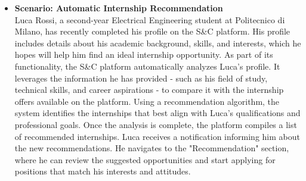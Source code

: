 \begin{itemize}
        \incscenario
    \item \textbf{\nth{\thescenario} Scenario: Automatic Internship Recommendation}
    \\
        Luca Rossi, a second-year Electrical Engineering student at Politecnico di Milano, has recently completed his profile on the S\&C platform. His profile includes details about his academic background, skills, and interests, which he hopes will help him find an ideal internship opportunity.
        As part of its functionality, the S\&C platform automatically analyzes Luca’s profile. It leverages the information he has provided - such as his field of study, technical skills, and career aspirations - to compare it with the internship offers available on the platform. Using a recommendation algorithm, the system identifies the internships that best align with Luca’s qualifications and professional goals.
        Once the analysis is complete, the platform compiles a list of recommended internships. Luca receives a notification informing him about the new recommendations. He navigates to the "Recommendation" section, where he can review the suggested opportunities and start applying for positions that match his interests and attitudes.


\end{itemize}
